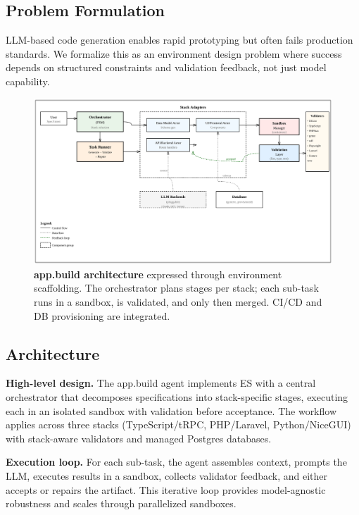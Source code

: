 \documentclass{article}
\begin{document}
\subsection{Problem Formulation}

LLM-based code generation enables rapid prototyping but often fails production standards. We formalize this as an environment design problem where success depends on structured constraints and validation feedback, not just model capability.

\begin{figure}[t]
  \centering
  \includegraphics[width=\linewidth]{diagrams/appbuild-arch.png}
  \vspace{-0.5em}
  \caption{\textbf{app.build architecture} expressed through environment scaffolding. The orchestrator plans stages per stack; each sub-task runs in a sandbox, is validated, and only then merged. CI/CD and DB provisioning are integrated.}
  \label{fig:appbuild-arch}
\end{figure}

\subsection{Architecture}

\textbf{High-level design.} The app.build agent implements ES with a central orchestrator that decomposes specifications into stack-specific stages, executing each in an isolated sandbox with validation before acceptance. The workflow applies across three stacks (TypeScript/tRPC, PHP/Laravel, Python/NiceGUI) with stack-aware validators and managed Postgres databases.

\textbf{Execution loop.} For each sub-task, the agent assembles context, prompts the LLM, executes results in a sandbox, collects validator feedback, and either accepts or repairs the artifact. This iterative loop provides model-agnostic robustness and scales through parallelized sandboxes.
\end{document}
